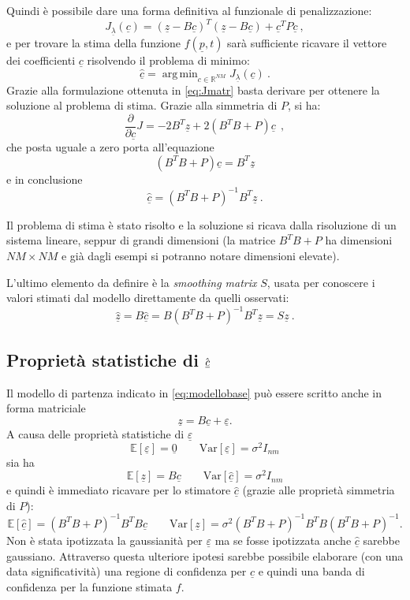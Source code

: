 \documentclass[a4paper,11pt,twoside,openright]{book}							%
\DeclareMathOperator*{\argmin}{arg\,min}
\begin{document}
Quindi è possibile dare una forma definitiva al funzionale di penalizzazione:
\begin{equation} 
\label{eq:Jmatr}
J_{\underline \lambda }(\underline c) = (\underline z - B \underline c)^T (\underline z - B \underline c) + \underline c^T P \underline c \ ,
\end{equation}
e per trovare la stima della funzione $f(\underline{p},t)$ sarà sufficiente ricavare il vettore dei coefficienti $\underline c$ risolvendo il problema di minimo:
$$
\hat{\underline{c}}=\argmin_{c \in \mathbb{R}^{NM}} J_{\underline \lambda }(\underline c) \ .
$$
Grazie alla formulazione ottenuta in \ref{eq:Jmatr} basta derivare per ottenere la soluzione al problema di stima. Grazie alla simmetria di $P$, si ha:
$$
\frac{\partial}{\partial \underline c}J= -2 B^T \underline z + 2(B^T B + P) \underline c \ \ ,
$$
che posta uguale a zero porta all'equazione
$$
(B^T B + P) \underline c = B^T\underline z
$$ 
e in conclusione
\begin{equation}
\label{eq:sysnocovar}
\hat  {\underline c} = (B^T B + P)^{-1}B^T \underline z \ .
\end{equation} 

Il problema di stima è stato risolto e la soluzione si ricava dalla risoluzione di un sistema lineare, seppur di grandi dimensioni (la matrice $B^T B + P$ ha dimensioni $NM \times NM$ e già dagli esempi si potranno notare dimensioni elevate).

L'ultimo elemento da definire è la \textit{smoothing matrix} $S$, usata per conoscere i valori stimati dal modello direttamente da quelli osservati:
$$
\hat  {\underline z} =B\hat  {\underline c} = B(B^T B + P)^{-1}B^T \underline z = S\underline{z} \ .
$$



\subsection{Proprietà statistiche di $\hat  {\protect\underline{c}}$}
Il modello di partenza indicato in \ref{eq:modellobase} può essere scritto anche in forma matriciale
\begin{equation}
\label{eq:modellobasematric}
\underline z=B \underline c + \underline \varepsilon .
\end{equation}
A causa delle proprietà statistiche di $\underline \varepsilon$
$$
\mathbb{E}[\underline \varepsilon] = \underline 0 \qquad \mathrm{Var}[\underline \varepsilon] = \sigma^2 I_{nm}
$$
sia ha
$$
\mathbb{E}[\underline z] = B \underline c \qquad \mathrm{Var}[\hat  {\underline c}] = \sigma^2 I_{nm}
$$
e quindi è immediato ricavare per lo stimatore $\hat  {\underline c}$ (grazie alle proprietà simmetria di $P$):
$$
\mathbb{E}[\hat  {\underline c}] = (B^T B + P)^{-1}B^TB \underline c \qquad \mathrm{Var}[\underline z] = \sigma^2 (B^T B + P)^{-1}B^TB(B^T B + P)^{-1} .
$$
Non è stata ipotizzata la gaussianità per $\underline \varepsilon$ ma se fosse ipotizzata anche $\hat  {\underline c}$ sarebbe gaussiano. Attraverso questa ulteriore ipotesi sarebbe possibile elaborare (con una data significatività) una regione di confidenza per $\hat  {\underline c}$ e quindi una banda di confidenza per la funzione stimata $f$.
\end{document}

